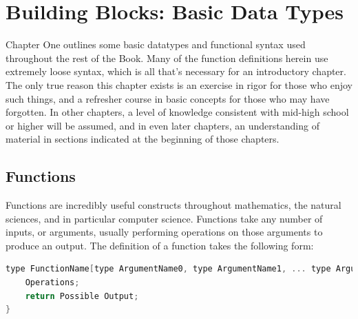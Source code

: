 \chapter{Building Blocks: Basic Data Types}
\lstset{style=BrenMat}

Chapter One outlines some basic datatypes and functional syntax used throughout the rest of the Book. Many of the function definitions herein use extremely loose syntax, which is all that's necessary for an introductory chapter. The only true reason this chapter exists is an exercise in rigor for those who enjoy such things, and a refresher course in basic concepts for those who may have forgotten. In other chapters, a level of knowledge consistent with mid-high school or higher will be assumed, and in even later chapters, an understanding of material in sections indicated at the beginning of those chapters.


\section{Functions}

Functions are incredibly useful constructs throughout mathematics, the natural sciences, and in particular
computer science. Functions take any number of inputs, or arguments, usually performing operations on those arguments to
produce an output. The definition of a function takes the following form:
\begin{center}
\begin{lstlisting}[language=C,caption=Function Example,label=lst:funcEx]
type FunctionName[type ArgumentName0, type ArgumentName1, ... type ArgumentNameN]{
	Operations;
	return Possible Output;
}
\end{lstlisting}
\end{center}

